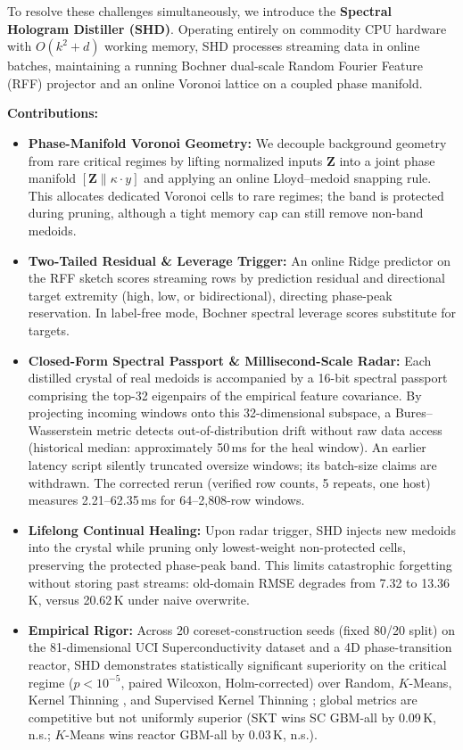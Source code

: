 \documentclass[11pt,a4paper]{article}
\begin{document}
To resolve these challenges simultaneously, we introduce the \textbf{Spectral Hologram Distiller (SHD)}. Operating entirely on commodity CPU hardware with $O(k^2 + d)$ working memory, SHD processes streaming data in online batches, maintaining a running Bochner dual-scale Random Fourier Feature (RFF) projector \citep{rahimi2007random} and an online Voronoi lattice on a coupled phase manifold.

\textbf{Contributions:}
\begin{itemize}
    \item \textbf{Phase-Manifold Voronoi Geometry:} We decouple background geometry from rare critical regimes by lifting normalized inputs $\mathbf{Z}$ into a joint phase manifold $[\mathbf{Z} \parallel \kappa \cdot y]$ and applying an online Lloyd--medoid snapping rule. This allocates dedicated Voronoi cells to rare regimes; the band is protected during pruning, although a tight memory cap can still remove non-band medoids.
    \item \textbf{Two-Tailed Residual \& Leverage Trigger:} An online Ridge predictor on the RFF sketch scores streaming rows by prediction residual and directional target extremity (high, low, or bidirectional), directing phase-peak reservation. In label-free mode, Bochner spectral leverage scores substitute for targets.
    \item \textbf{Closed-Form Spectral Passport \& Millisecond-Scale Radar:} Each distilled crystal of real medoids is accompanied by a 16-bit spectral passport comprising the top-32 eigenpairs of the empirical feature covariance. By projecting incoming windows onto this 32-dimensional subspace, a Bures--Wasserstein metric \citep{bhatia2019bures} detects out-of-distribution drift without raw data access (historical median: approximately 50\,ms for the heal window). An earlier latency script silently truncated oversize windows; its batch-size claims are withdrawn. The corrected rerun (verified row counts, 5 repeats, one host) measures 2.21--62.35\,ms for 64--2{,}808-row windows.
    \item \textbf{Lifelong Continual Healing:} Upon radar trigger, SHD injects new medoids into the crystal while pruning only lowest-weight non-protected cells, preserving the protected phase-peak band. This limits catastrophic forgetting without storing past streams: old-domain RMSE degrades from 7.32 to 13.36\,K, versus 20.62\,K under naive overwrite.
    \item \textbf{Empirical Rigor:} Across 20 coreset-construction seeds (fixed 80/20 split) on the 81-dimensional UCI Superconductivity dataset \citep{hamidieh2018data} and a 4D phase-transition reactor, SHD demonstrates statistically significant superiority on the critical regime ($p < 10^{-5}$, paired Wilcoxon, Holm-corrected) over Random, $K$-Means, Kernel Thinning \citep{dwivedi2024kernel}, and Supervised Kernel Thinning \citep{gong2024supervised}; global metrics are competitive but not uniformly superior (SKT wins SC GBM-all by 0.09\,K, n.s.; $K$-Means wins reactor GBM-all by 0.03\,K, n.s.).
\end{itemize}
\end{document}
